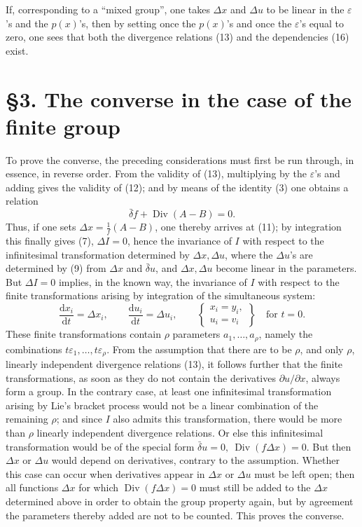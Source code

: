 \documentclass[11pt]{article}
\newcommand{\D}{\Delta}
\providecommand{\eps}{\varepsilon}
\providecommand{\dd}{\mathrm d}
\providecommand{\Div}{\operatorname{Div}}
\providecommand{\bd}{\bar{\delta}}
\providecommand{\p}{\partial}
\begin{document}
If, corresponding to a ``mixed group'', one takes \(\D x\) and \(\D u\) to be linear in the \(\eps\)'s and the \(p(x)\)'s, then by setting once the \(p(x)\)'s and once the \(\eps\)'s equal to zero, one sees that both the divergence relations (13) and the dependencies (16) exist.

\section*{\S{}3. The converse in the case of the finite group}

To prove the converse, the preceding considerations must first be run through, in essence, in reverse order. From the validity of (13), multiplying by the \(\eps\)'s and adding gives the validity of (12); and by means of the identity (3) one obtains a relation
\[
\bd f+\Div(A-B)=0.
\]
Thus, if one sets \(\D x=\frac1f(A-B)\), one thereby arrives at (11); by integration this finally gives (7), \(\D I=0\), hence the invariance of \(I\) with respect to the infinitesimal transformation determined by \(\D x,\D u\), where the \(\D u\)'s are determined by (9) from \(\D x\) and \(\bd u\), and \(\D x,\D u\) become linear in the parameters. But \(\D I=0\) implies, in the known way, the invariance of \(I\) with respect to the finite transformations arising by integration of the simultaneous system:
\begin{equation}
\frac{\dd x_i}{\dd t}=\D x_i,\qquad
\frac{\dd u_i}{\dd t}=\D u_i,\qquad
\left\{\begin{array}{l}
x_i=y_i,\\
u_i=v_i
\end{array}\right\}
\quad\text{for }t=0.
\tag{17}
\end{equation}
These finite transformations contain \(\rho\) parameters \(a_1,\ldots,a_\rho\), namely the combinations \(t\eps_1,\ldots,t\eps_\rho\). From the assumption that there are to be \(\rho\), and only \(\rho\), linearly independent divergence relations (13), it follows further that the finite transformations, as soon as they do not contain the derivatives \(\p u/\p x\), always form a group. In the contrary case, at least one infinitesimal transformation arising by Lie's bracket process would not be a linear combination of the remaining \(\rho\); and since \(I\) also admits this transformation, there would be more than \(\rho\) linearly independent divergence relations. Or else this infinitesimal transformation would be of the special form \(\bd u=0,\ \Div(f\D x)=0\). But then \(\D x\) or \(\D u\) would depend on derivatives, contrary to the assumption. Whether this case can occur when derivatives appear in \(\D x\) or \(\D u\) must be left open; then all functions \(\D x\) for which \(\Div(f\D x)=0\) must still be added to the \(\D x\) determined above in order to obtain the group property again, but by agreement the parameters thereby added are not to be counted. This proves the converse.
\end{document}
